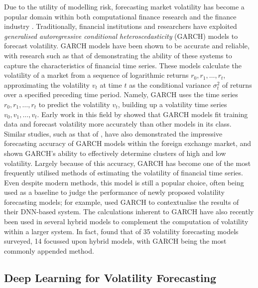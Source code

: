 \documentclass[a4paper, 11pt]{report}
\begin{document}
    Due to the utility of modelling risk, forecasting market volatility has become a popular domain within both computational finance research \citep{ozbayoglu-2020} and the finance industry \citep{chartis-2019}. Traditionally, financial institutions and researchers have exploited \emph{generalised autoregressive conditional heteroscedasticity} (GARCH) models to forecast volatility. GARCH models have been shown to be accurate and reliable, with research such as that of \citet{lahmiri-2017} demonstrating the ability of these systems to capture the characteristics of financial time series. These models calculate the volatility of a market from a sequence of logarithmic returns $r_0, r_1, \dots, r_t$, approximating the volatility $v_t$ at time $t$ as the conditional variance $\sigma_{t}^2$ of returns over a specified preceding time period. Namely, GARCH uses the time series $r_0, r_1, \dots, r_t$ to predict the volatility $v_t$, building up a volatility time series $v_0, v_1, \dots, v_t$. Early work in this field by \citet{akgiray-1989} showed that GARCH models fit training data and forecast volatility more accurately than other models in its class. Similar studies, such as that of \citet{hansen-2005}, have also demonstrated the impressive forecasting accuracy of GARCH models within the foreign exchange market, and shown GARCH's ability to effectively determine clusters of high and low volatility. Largely because of this accuracy, GARCH has become one of the most frequently utilised methods of estimating the volatility of financial time series. Even despite modern methods, this model is still a popular choice, often being used as a baseline to judge the performance of newly proposed volatility forecasting models; for example, \citet{rodikov-2022} used GARCH to contextualise the results of their DNN-based system. The calculations inherent to GARCH have also recently been used in several hybrid models to complement the computation of volatility within a larger system. In fact, \citet{ge-2022} found that of 35 volatility forecasting models surveyed, 14 focussed upon hybrid models, with GARCH being the most commonly appended method.


    \subsection{Deep Learning for Volatility Forecasting}
\end{document}
